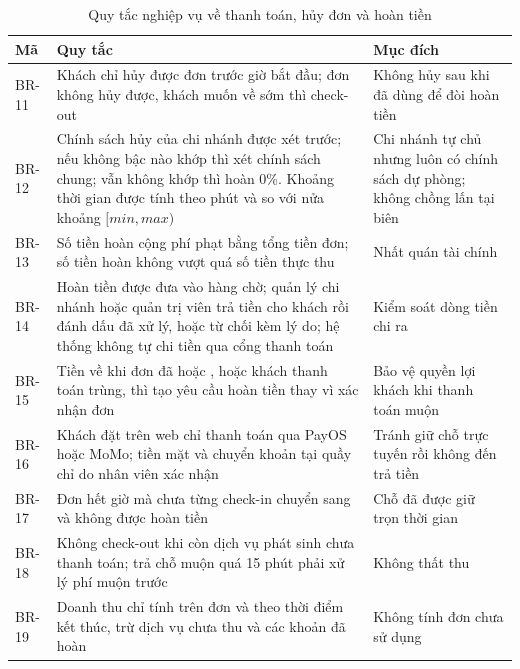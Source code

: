 \begin{table}[!htbp]
\centering
\caption{Quy tắc nghiệp vụ về thanh toán, hủy đơn và hoàn tiền}
\label{tab:rule_payment}
\small
\renewcommand{\arraystretch}{1.2}
\begin{tabularx}{\linewidth}{|P{1.3cm}|L|P{4.6cm}|}
\hline
\textbf{Mã} & \textbf{Quy tắc} & \textbf{Mục đích} \\
\hline
BR-11 & Khách chỉ hủy được đơn trước giờ bắt đầu; đơn  không hủy được, khách muốn về sớm thì check-out & Không hủy sau khi đã dùng để đòi hoàn tiền \\
\hline
BR-12 & Chính sách hủy của chi nhánh được xét trước; nếu không bậc nào khớp thì xét chính sách chung; vẫn không khớp thì hoàn 0\%. Khoảng thời gian được tính theo phút và so với nửa khoảng $[min, max)$ & Chi nhánh tự chủ nhưng luôn có chính sách dự phòng; không chồng lấn tại biên \\
\hline
BR-13 & Số tiền hoàn cộng phí phạt bằng tổng tiền đơn; số tiền hoàn không vượt quá số tiền thực thu & Nhất quán tài chính \\
\hline
BR-14 & Hoàn tiền được đưa vào hàng chờ; quản lý chi nhánh hoặc quản trị viên trả tiền cho khách rồi đánh dấu đã xử lý, hoặc từ chối kèm lý do; hệ thống không tự chi tiền qua cổng thanh toán & Kiểm soát dòng tiền chi ra \\
\hline
BR-15 & Tiền về khi đơn đã  hoặc , hoặc khách thanh toán trùng, thì tạo yêu cầu hoàn tiền thay vì xác nhận đơn & Bảo vệ quyền lợi khách khi thanh toán muộn \\
\hline
BR-16 & Khách đặt trên web chỉ thanh toán qua PayOS hoặc MoMo; tiền mặt và chuyển khoản tại quầy chỉ do nhân viên xác nhận & Tránh giữ chỗ trực tuyến rồi không đến trả tiền \\
\hline
BR-17 & Đơn  hết giờ mà chưa từng check-in chuyển sang  và không được hoàn tiền & Chỗ đã được giữ trọn thời gian \\
\hline
BR-18 & Không check-out khi còn dịch vụ phát sinh chưa thanh toán; trả chỗ muộn quá 15 phút phải xử lý phí muộn trước & Không thất thu \\
\hline
BR-19 & Doanh thu chỉ tính trên đơn  và  theo thời điểm kết thúc, trừ dịch vụ chưa thu và các khoản đã hoàn & Không tính đơn chưa sử dụng \\
\hline
\end{tabularx}
\end{table}

